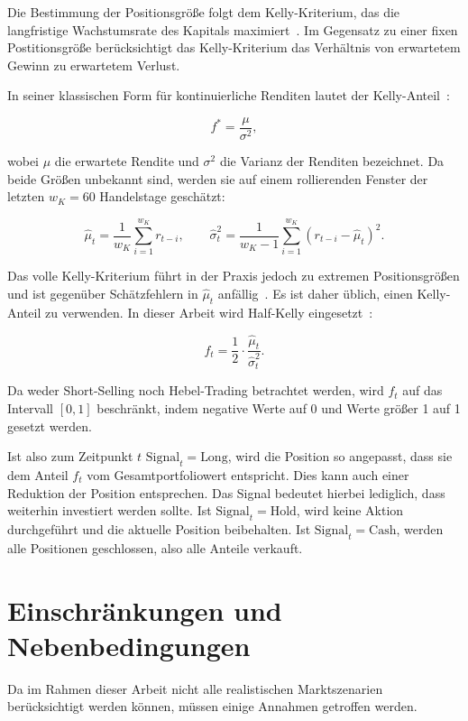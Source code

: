 Die Bestimmung der Positionsgröße folgt dem Kelly-Kriterium, das die langfristige Wachstumsrate des Kapitals maximiert~\cite{kelly1956}. Im Gegensatz zu einer fixen Postitionsgröße berücksichtigt das Kelly-Kriterium das Verhältnis von erwartetem Gewinn zu erwartetem Verlust.

In seiner klassischen Form für kontinuierliche Renditen lautet der Kelly-Anteil~\cite{thorp2006}:

\begin{equation}
    f^* = \frac{\mu}{\sigma^2},
\end{equation}

wobei $\mu$ die erwartete Rendite und $\sigma^2$ die Varianz der Renditen bezeichnet. Da beide Größen unbekannt sind, werden sie auf einem rollierenden Fenster der letzten $w_K = 60$ Handelstage geschätzt:

\begin{equation}
    \hat{\mu}_t = \frac{1}{w_K} \sum_{i=1}^{w_K} r_{t-i}, \qquad
    \hat{\sigma}^2_t = \frac{1}{w_K - 1} \sum_{i=1}^{w_K} (r_{t-i} - \hat{\mu}_t)^2.
\end{equation}

Das volle Kelly-Kriterium führt in der Praxis jedoch zu extremen Positionsgrößen und ist gegenüber Schätzfehlern in $\hat{\mu}_t$ anfällig~\cite{maclean2011}. Es ist daher üblich, einen Kelly-Anteil zu verwenden. In dieser Arbeit wird Half-Kelly eingesetzt~\cite{thorp2006}:

\begin{equation}
    f_t = \frac{1}{2} \cdot \frac{\hat{\mu}_t}{\hat{\sigma}^2_t}.
\end{equation}

Da weder Short-Selling noch Hebel-Trading betrachtet werden, wird $f_t$ auf das Intervall $[0, 1]$ beschränkt, indem negative Werte auf 0 und Werte größer 1 auf 1 gesetzt werden.

Ist also zum Zeitpunkt $t$ $\text{Signal}_t = \text{Long}$, wird die Position so angepasst, dass sie dem Anteil $f_t$ vom Gesamtportfoliowert entspricht. Dies kann auch einer Reduktion der Position entsprechen. Das Signal bedeutet hierbei lediglich, dass weiterhin investiert werden sollte. Ist $\text{Signal}_t = \text{Hold}$, wird keine Aktion durchgeführt und die aktuelle Position beibehalten. Ist $\text{Signal}_t = \text{Cash}$, werden alle Positionen geschlossen, also alle Anteile verkauft.

\section{Einschränkungen und Nebenbedingungen}\label{sec:einschrankungen}
Da im Rahmen dieser Arbeit nicht alle realistischen Marktszenarien berücksichtigt werden können, müssen einige Annahmen getroffen werden.

